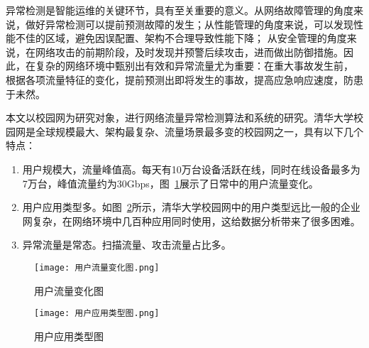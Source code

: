 异常检测是智能运维的关键环节，具有至关重要的意义。从网络故障管理的角度来说，做好异常检测可以提前预测故障的发生；从性能管理的角度来说，可以发现性能不佳的区域，避免因误配置、架构不合理导致性能下降；
从安全管理的角度来说，在网络攻击的前期阶段，及时发现并预警后续攻击，进而做出防御措施。因此，在复杂的网络环境中甄别出有效和异常流量尤为重要：在重大事故发生前，
根据各项流量特征的变化，提前预测出即将发生的事故，提高应急响应速度，防患于未然。


本文以校园网为研究对象，进行网络流量异常检测算法和系统的研究。清华大学校园网是全球规模最大、架构最复杂、流量场景最多变的校园网之一，具有以下几个特点：
\begin{enumerate}
    \item 用户规模大，流量峰值高。每天有10万台设备活跃在线，同时在线设备最多为7万台，峰值流量约为30Gbps，图~\ref{fig:用户流量变化图}展示了日常中的用户流量变化。
    \item	用户应用类型多。如图~\ref{fig:用户应用类型图}所示，清华大学校园网中的用户类型远比一般的企业网复杂，在网络环境中几百种应用同时使用，这给数据分析带来了很多困难。
    \item	异常流量是常态。扫描流量、攻击流量占比多。
\end{enumerate}

\begin{figure}
  \centering
  \texttt{[image: 用户流量变化图.png]}
  \caption{用户流量变化图}
  \label{fig:用户流量变化图}
\end{figure}

\begin{figure}
  \centering
  \texttt{[image: 用户应用类型图.png]}
  \caption{用户应用类型图}
  \label{fig:用户应用类型图}
\end{figure}



